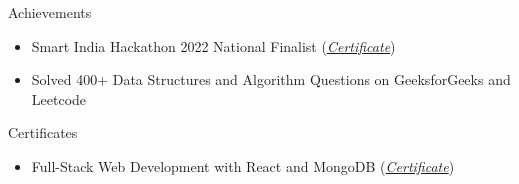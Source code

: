 \documentclass{resume} %
\begin{document}







\begin{rSection}{Achievements}
\begin{itemize}
   \item {Smart India Hackathon 2022 National Finalist} {\normalfont (\href{https://drive.google.com/file/d/1No-u1sUaclG-nf7_Gtym5JDEz1ydyRSL/view?usp=sharing}{\emph{Certificate}})}
    \item { {\normalfont Solved} 400+ {\normalfont Data Structures and Algorithm Questions on} GeeksforGeeks {\normalfont and} Leetcode}
\end{itemize}
\end{rSection}





\begin{rSection}{Certificates}
\begin{itemize}
   \item {Full-Stack Web Development with React and MongoDB} {\normalfont (\href{https://www.udemy.com/certificate/UC-156daafe-cfd7-4b60-82be-4d995f308dbc/}{\emph{Certificate}})}
   \\
\end{itemize}



\end{rSection}



\end{document}
